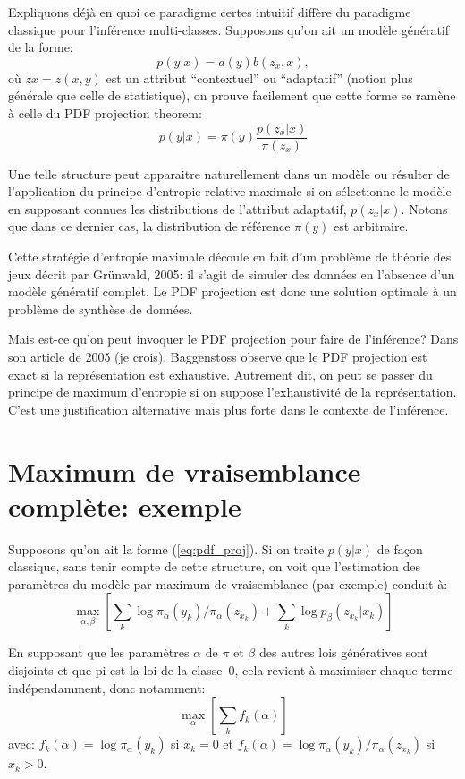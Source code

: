 \documentclass{article}
\begin{document}
Expliquons d\'ej\`a en quoi ce paradigme certes intuitif diff\`ere du paradigme classique pour l'inf\'erence multi-classes. Supposons qu'on ait un mod\`ele g\'en\'eratif de la forme: 
$$
p(y|x) = a(y) b(z_x, x),
$$ 
o\`u $zx = z(x, y)$ est un attribut ``contextuel'' ou ``adaptatif'' (notion plus g\'en\'erale que celle de statistique), on prouve facilement que cette forme se ram\`ene \`a celle du PDF projection theorem: 
\begin{equation}
\label{eq:pdf_proj}
p(y|x) = \pi(y) \frac{p(z_x|x)}{\pi(z_x)}
\end{equation}

Une telle structure peut apparaitre naturellement dans un mod\`ele ou r\'esulter de l'application du principe d'entropie relative maximale si on s\'electionne le mod\`ele en supposant connues les distributions de l'attribut adaptatif, $p(z_x|x)$. Notons que dans ce dernier cas, la distribution de r\'ef\'erence $\pi(y)$ est arbitraire.

Cette strat\'egie d'entropie maximale d\'ecoule en fait d'un probl\`eme de th\'eorie des jeux d\'ecrit par Gr\"unwald, 2005: il s'agit de simuler des donn\'ees en l'absence d'un mod\`ele g\'en\'eratif complet. Le PDF projection est donc une solution optimale \`a un probl\`eme de synth\`ese de donn\'ees.

Mais est-ce qu'on peut invoquer le PDF projection pour faire de l'inf\'erence? Dans son article de 2005 (je crois), Baggenstoss observe que le PDF projection est exact si la repr\'esentation est exhaustive. Autrement dit, on peut se passer du principe de maximum d'entropie si on suppose l'exhaustivit\'e de la repr\'esentation. C'est une justification alternative mais plus forte dans le contexte de l'inf\'erence.


\section{Maximum de vraisemblance compl\`ete: exemple}

Supposons qu'on ait la forme (\ref{eq:pdf_proj}). Si on traite $p(y|x)$ de fa\c{c}on classique, sans tenir compte de cette structure, on voit que l'estimation des param\`etres du mod\`ele par maximum de vraisemblance (par exemple) conduit \`a: 
$$
\max_{\alpha, \beta} \left[
\sum_k \log \pi_\alpha(y_k)/\pi_\alpha(z_{x_k}) + \sum_k \log p_\beta(z_{x_k}|x_k)
\right]
$$ 

En supposant que les param\`etres $\alpha$ de $\pi$ et $\beta$ des autres lois g\'en\'eratives sont disjoints et que pi est la loi de la classe~0, cela revient \`a maximiser chaque terme ind\'ependamment, donc notamment: 
$$
\max_\alpha \left[
\sum_k f_k(\alpha)
\right]
$$ 
avec: $ f_k(\alpha) = \log \pi_\alpha(y_k)$  si $x_k = 0$ et $f_k(\alpha) = \log \pi_\alpha(y_k)/\pi_\alpha(z_{x_k})$ si $x_k > 0$.
\end{document}
